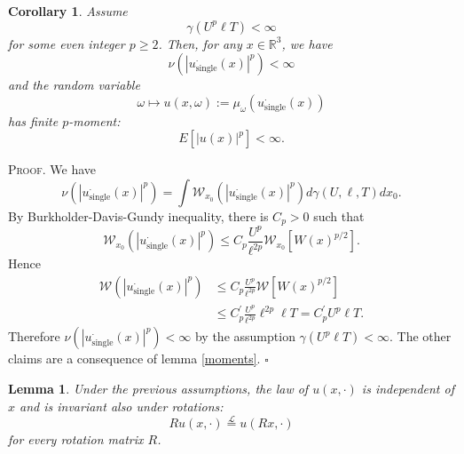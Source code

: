 \documentclass[a4paper,12pt]{article}
\newtheorem{lemma}{Lemma}
\newtheorem{corollary}{Corollary}
\begin{document}
\begin{corollary}
\label{corollintegr}Assume
\[
\gamma(U^{p}\ell T)<\infty
\]
for some even integer $p\geq2$. Then, for any $x\in\mathbb{R}^{3}$, we have
\[
\nu\left(  \left|  u_{\text{single}}^{\cdot}\left(  x\right)  \right|
^{p}\right)  <\infty
\]
and the random variable
\[
\omega\mapsto u(x,\omega):=\mu_{\omega}\left(  u_{\text{single}}^{\cdot
}\left(  x\right)  \right)
\]
has finite $p$-moment:
\[
E\left[  \left|  u(x)\right|  ^{p}\right]  <\infty.
\]
\end{corollary}

\textsc{Proof. }We have
\[
\nu\left(  \left|  u_{\text{single}}^{\cdot}\left(  x\right)  \right|
^{p}\right)  =\int\mathcal{W}_{x_{0}}(\left|  u_{\text{single}}^{\cdot}\left(
x\right)  \right|  ^{p})d\gamma(U,\ell,T)dx_{0}.
\]
By Burkholder-Davis-Gundy inequality, there is $C_{p}>0$ such that
\[
\mathcal{W}_{x_{0}}(\left|  u_{\text{single}}^{\cdot}\left(  x\right)
\right|  ^{p})\leq C_{p}\frac{U^{p}}{\ell^{2p}}\mathcal{W}_{x_{0}}\left[
W(x)^{p/2}\right]  .
\]
Hence
\begin{align*}
\mathcal{W}(\left|  u_{\text{single}}^{\cdot}\left(  x\right)  \right|  ^{p})
&  \leq C_{p}\frac{U^{p}}{\ell^{2p}}\mathcal{W}\left[  W(x)^{p/2}\right] \\
&  \leq C_{p}^{\prime}\frac{U^{p}}{\ell^{2p}}\ell^{2p}\ell T=C_{p}^{\prime
}U^{p}\ell T.
\end{align*}
Therefore $\nu\left(  \left|  u_{\text{single}}^{\cdot}\left(  x\right)
\right|  ^{p}\right)  <\infty$ by the assumption $\gamma(U^{p}\ell T)<\infty$.
The other claims are a consequence of lemma \ref{moments}. \hfill$\square$

\begin{lemma}
\label{symmetries}Under the previous assumptions, the law of $u(x,\cdot)$ is
independent of $x$ and is invariant also under rotations:
\[
Ru(x,\cdot)\overset{\mathcal{L}}{=}u(Rx,\cdot)
\]
for every rotation matrix $R$.
\end{lemma}
\end{document}
